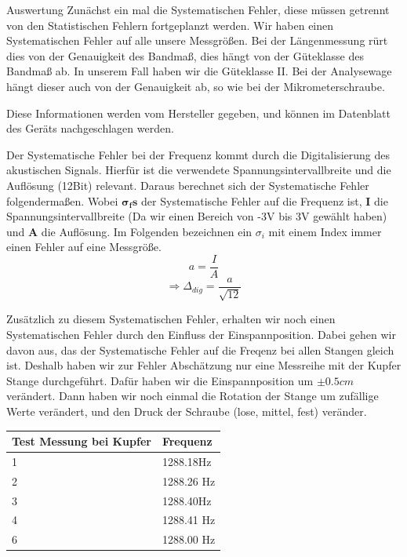 \documentclass[twoside]{protokoll}
\begin{document}
\begin{aufgabe}{Auswertung}
Zunächst ein mal die Systematischen Fehler, diese müssen getrennt von den Statistischen Fehlern fortgeplanzt werden.
Wir haben einen Systematischen Fehler auf alle unsere Messgrößen.
Bei der Längenmessung rürt dies von der Genauigkeit des Bandmaß, dies hängt von der Güteklasse des Bandmaß ab.
In unserem Fall haben wir die Güteklasse II.
Bei der Analysewage  hängt dieser auch von der Genauigkeit ab, so wie bei der Mikrometerschraube. 
 
Diese Informationen werden vom Hersteller gegeben, und können im Datenblatt des Geräts nachgeschlagen werden. 


Der Systematische Fehler bei der Frequenz kommt durch die Digitalisierung des akustischen Signals. Hierfür ist die verwendete Spannungsintervallbreite und die Auflösung (12Bit) relevant. Daraus berechnet sich der Systematische Fehler folgendermaßen. Wobei  $\mathbf{\sigma_fs}$ der Systematische Fehler auf die Frequenz ist, \textbf{I} die Spannungsintervallbreite (Da wir einen Bereich von -3V bis 3V gewählt haben) und \textbf{A} die Auflösung. Im Folgenden bezeichnen ein $\sigma_i$ mit einem Index immer einen Fehler auf eine Messgröße. 
\begin{equation}
         a = \frac{I}{A}
    \end{equation}
\begin{equation}
         \Rightarrow 
         \Delta_{dig} = \frac{a}{\sqrt{12}}
\end{equation}

Zusätzlich zu diesem Systematischen Fehler, erhalten wir noch einen Systematischen Fehler durch den Einfluss der Einspannposition.
Dabei gehen wir davon aus, das der Systematische Fehler auf die Freqenz bei allen Stangen gleich ist.
Deshalb haben wir zur Fehler Abschätzung nur eine Messreihe mit der Kupfer Stange durchgeführt.
Dafür haben wir die Einspannposition um $\pm{0.5}{cm}$ verändert.
Dann haben wir noch einmal die Rotation der Stange um zufällige Werte verändert, und den Druck der Schraube (lose, mittel, fest) veränder.
 

\begin{table}[H]
    \centering
    \begin{tabularx}{0.7\textwidth}{X l} %
        \toprule
        \textbf{Test Messung bei Kupfer} & \textbf{Frequenz} \\
        \midrule
            1 & 1288.18Hz \\
            2 & 1288.26 Hz \\
            3 & 1288.40Hz \\
            4 & 1288.41 Hz \\
            6 & 1288.00 Hz \\
        \bottomrule
    \end{tabularx}
    \label{tab:mytable}
\end{table}


\end{aufgabe}
\end{document}

